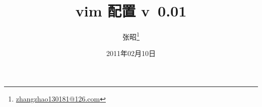 \documentclass[11pt]{book}
\renewcommand{\chaptername}{第\CJKnumber{\thechapter}章}
\begin{document}
\begin{CJK}{UTF8}{hei}
\CJKindent %
\CJKtilde

\frontmatter

\title{\Huge vim 配置 v~0.01}
\author{张昭\footnote{\href{mailto:zhangzhao130181@126.com}{zhangzhao130181@126.com}}}
\date{2011年02月10日}
\maketitle



\renewcommand{\chaptermark}[1]{\markboth{#1}{}}


\tableofcontents

\mainmatter
\renewcommand{\chaptermark}[1]{\markboth{\chaptername\ #1}{}}
\renewcommand{\sectionmark}[1]{\markright{\thesection\ #1}}







%





%






\backmatter



\newpage

\end{CJK}
\end{document}
